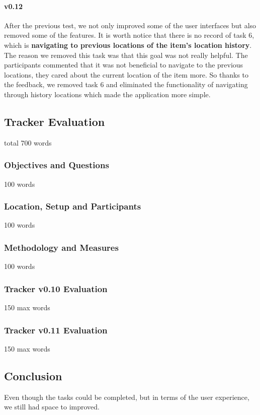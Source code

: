\documentclass[12pt,a4paper]{article}
\begin{document}
          \paragraph{v0.12} After the previous test, we not only improved some of the user interfaces but also removed some of the features. It is worth notice that there is no record of task 6, which is {\bf navigating to previous locations of the item's location history}. The reason we removed this task was that this goal was not really helpful. The participants commented that it was not beneficial to navigate to the previous locations, they cared about the current location of the item more. So thanks to the feedback, we removed task 6 and eliminated the functionality of navigating through history locations which made the application more simple. 
        
        \subsection{Tracker Evaluation}
            total 700 words
          \subsubsection{Objectives and Questions}
            100 words
          \subsubsection{Location, Setup and Participants}
            100 words
          \subsubsection{Methodology and Measures}
            100 words
          \subsubsection{Tracker v0.10 Evaluation}
            150 max words
          \subsubsection{Tracker v0.11 Evaluation}
            150 max words
        \subsection{Conclusion}
          Even though the tasks could be completed, but in terms of the user experience, we still had space to improved. 
      \newpage
      
\end{document}
